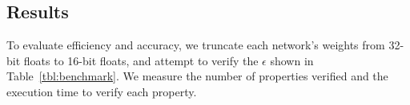 \subsection{Results}


To evaluate efficiency and accuracy, we truncate each network's weights from 32-bit floats to 16-bit floats, and attempt to verify the $ \epsilon $ shown in Table~\ref{tbl:benchmark}. We measure the number of properties verified and the execution time to verify each property.

